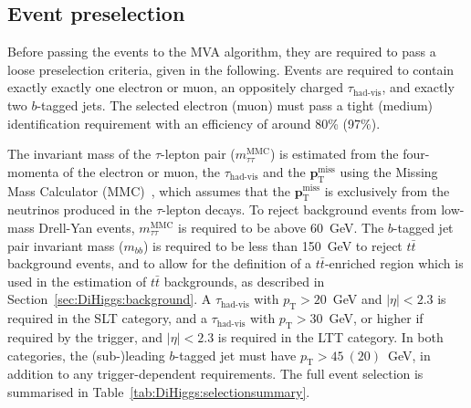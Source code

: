 \subsection{Event preselection}
\label{sec:DiHiggs:preselection}
Before passing the events to the MVA algorithm, they are required to pass a loose
preselection criteria, given in the following. 
Events are required to contain exactly exactly 
one electron or muon, 
an oppositely charged $\tau_\text{had-vis}$, 
and exactly two $b$-tagged jets.
The selected electron (muon) must pass a 
tight (medium) identification requirement with an efficiency of around 80\% (97\%).

The invariant mass of the $\tau$-lepton pair ($m_{\tau\tau}^\text{MMC}$) 
is estimated from the four-momenta of the electron or muon, 
the $\tau_\text{had-vis}$ and the $\mathbf{p}_\text{T}^\text{miss}$ 
using the Missing Mass Calculator (MMC)~\cite{Elagin:2010aw}, 
which assumes that the $\mathbf{p}_\text{T}^\text{miss}$ is exclusively from the neutrinos 
produced in the $\tau$-lepton decays. 
To reject background events from low-mass Drell-Yan events, $m_{\tau\tau}^\text{MMC}$ is required to be above 60~GeV.
The $b$-tagged jet pair invariant mass ($m_{bb}$) is required to be less than 150~GeV 
to reject $t\bar t$ background events, and to allow for the definition of 
a $t\bar t$-enriched region which is used in the estimation of $t\bar t$ backgrounds, 
as described in Section~\ref{sec:DiHiggs:background}. 
A $\tau_\text{had-vis}$ with $p_\text{T}>20$~GeV and 
$\vert\eta\vert<2.3$ is required in the SLT category, 
and a $\tau_\text{had-vis}$ with $p_\text{T}>30$~GeV, 
or higher if required by the trigger, 
and $\vert\eta\vert<2.3$ is required in the LTT category. 
In both categories, the (sub-)leading $b$-tagged jet 
must have $p_\text{T}>45~(20)$~GeV, 
in addition to any trigger-dependent requirements.
The full event selection is summarised in Table~\ref{tab:DiHiggs:selectionsummary}. 

